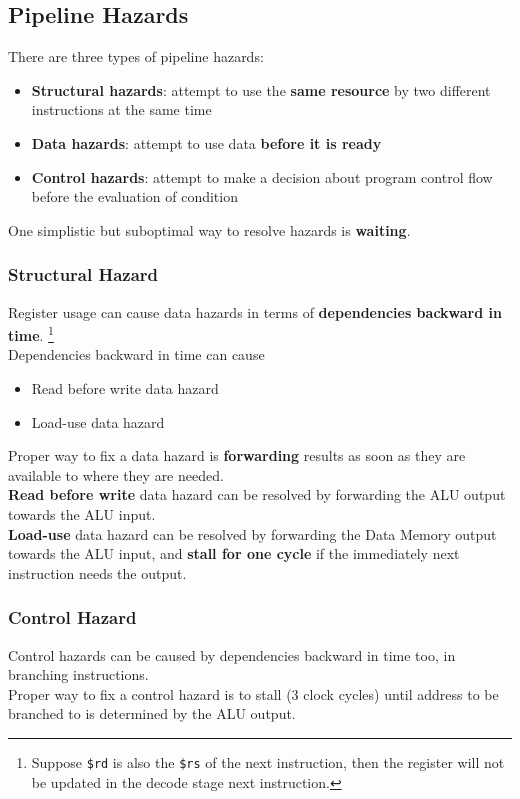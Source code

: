 \documentclass[12pt]{article}
\theoremstyle{definition}
\begin{document}
\subsection{Pipeline Hazards}
There are three types of pipeline hazards:
\begin{itemize}
  \item \textbf{Structural hazards}: attempt to use the \textbf{same resource} by two different instructions at the same time
  \item \textbf{Data hazards}: attempt to use data \textbf{before it is ready}
  \item \textbf{Control hazards}: attempt to make a decision about program control flow before the evaluation of condition
\end{itemize}
One simplistic but suboptimal way to resolve hazards is \textbf{waiting}.
\subsubsection{Structural Hazard}
Register usage can cause data hazards in terms of \textbf{dependencies backward in time}. \footnote{Suppose \texttt{\$rd} is also the \texttt{\$rs} of the next instruction, then the register will not be updated in the decode stage next instruction. }\\
Dependencies backward in time can cause
\begin{itemize}
  \item Read before write data hazard
  \item Load-use data hazard
\end{itemize}
Proper way to fix a data hazard is \textbf{forwarding} results as soon as they are available to where they are needed.\\
\textbf{Read before write} data hazard can be resolved by forwarding the ALU output towards the ALU input.\\
\textbf{Load-use} data hazard can be resolved by forwarding the Data Memory output towards the ALU input, and \textbf{stall for one cycle} if the immediately next instruction needs the output.
\subsubsection{Control Hazard}
Control hazards can be caused by dependencies backward in time too, in branching instructions.\\Proper way to fix a control hazard is to stall (3 clock cycles) until address to be branched to is determined by the ALU output.
\end{document}
